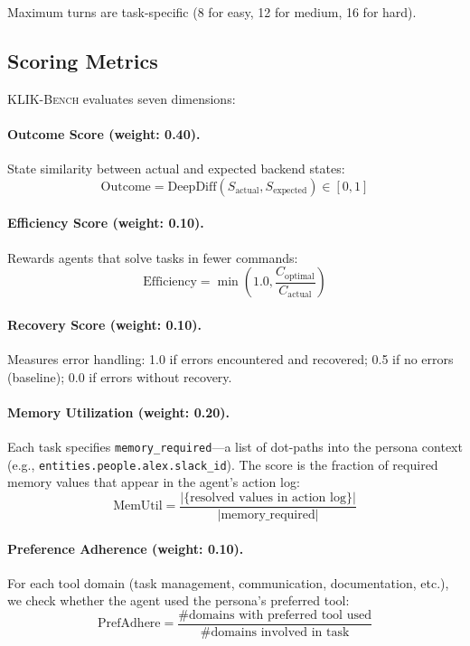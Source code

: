 \documentclass{article}
\newcommand{\klikbench}{\textsc{KLIK-Bench}}
\begin{document}
Maximum turns are task-specific (8 for easy, 12 for medium, 16 for hard).

\subsection{Scoring Metrics}

\klikbench{} evaluates seven dimensions:

\paragraph{Outcome Score (weight: 0.40).} State similarity between actual and expected backend states:
\begin{equation}
\text{Outcome} = \text{DeepDiff}(S_{\text{actual}}, S_{\text{expected}}) \in [0, 1]
\end{equation}

\paragraph{Efficiency Score (weight: 0.10).} Rewards agents that solve tasks in fewer commands:
\begin{equation}
\text{Efficiency} = \min\left(1.0, \frac{C_{\text{optimal}}}{C_{\text{actual}}}\right)
\end{equation}

\paragraph{Recovery Score (weight: 0.10).} Measures error handling: 1.0 if errors encountered and recovered; 0.5 if no errors (baseline); 0.0 if errors without recovery.

\paragraph{Memory Utilization (weight: 0.20).} Each task specifies \texttt{memory\_required}---a list of dot-paths into the persona context (e.g., \texttt{entities.people.alex.slack\_id}). The score is the fraction of required memory values that appear in the agent's action log:
\begin{equation}
\text{MemUtil} = \frac{|\{\text{resolved values in action log}\}|}{|\text{memory\_required}|}
\end{equation}

\paragraph{Preference Adherence (weight: 0.10).} For each tool domain (task management, communication, documentation, etc.), we check whether the agent used the persona's preferred tool:
\begin{equation}
\text{PrefAdhere} = \frac{\text{\# domains with preferred tool used}}{\text{\# domains involved in task}}
\end{equation}
\end{document}
